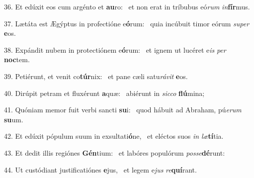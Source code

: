 36. Et edúxit eos cum argénto et \textbf{au}ro: \ast\  et non erat in tríbubus eó\textit{rum} \textit{in}\textbf{fír}mus.\

37. Lætáta est Ægýptus in profectióne e\textbf{ó}rum: \ast\  quia incúbuit timor eórum \textit{su}\textit{per} \textbf{e}os.\

38. Expándit nubem in protectiónem e\textbf{ó}rum: \ast\  et ignem ut lucéret e\textit{is} \textit{per} \textbf{noc}tem.\

39. Petiérunt, et venit co\textbf{túr}nix: \ast\  et pane cæli satu\textit{rá}\textit{vit} \textbf{e}os.\

40. Dirúpit petram et fluxérunt \textbf{a}quæ: \ast\  abiérunt in \textit{sic}\textit{co} \textbf{flú}mina;\

41. Quóniam memor fuit verbi sancti \textbf{su}i: \ast\  quod hábuit ad Abraham, pú\textit{e}\textit{rum} \textbf{su}um.\

42. Et edúxit pópulum suum in exsultati\textbf{ó}ne, \ast\  et eléctos suos \textit{in} \textit{læ}\textbf{tí}tia.\

43. Et dedit illis regiónes \textbf{Gén}tium: \ast\  et labóres populórum \textit{pos}\textit{se}\textbf{dé}runt:\

44. Ut custódiant justificatiónes \textbf{e}jus, \ast\  et legem e\textit{jus} \textit{re}\textbf{quí}rant.\


